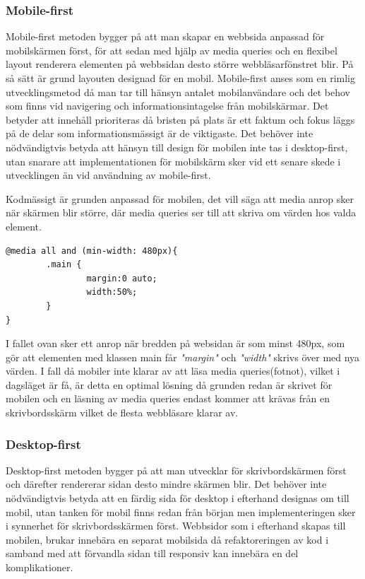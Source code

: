 \documentclass[11pt]{article}
\begin{document}
\subsubsection{Mobile-first}
Mobile-first metoden bygger på att man skapar en webbsida anpassad för mobilskärmen först, för att sedan med hjälp av media queries och en flexibel layout renderera elementen på webbsidan desto större webbläsarfönstret blir.  På så sätt är grund layouten designad för en mobil. Mobile-first anses som en rimlig utvecklingsmetod då man tar till hänsyn antalet mobilanvändare och det behov som finns vid navigering och informationsintagelse från mobilskärmar.  Det betyder att innehåll prioriteras då bristen på plats är ett faktum och fokus läggs på de delar som informationsmässigt är de viktigaste. Det behöver inte nödvändigtvis betyda att hänsyn till design för mobilen inte tas i desktop-first, utan snarare att implementationen för mobilskärm sker vid ett senare skede i utvecklingen än vid användning av mobile-first.

Kodmässigt är grunden anpassad för mobilen, det vill säga att media anrop sker när skärmen blir större, där media queries ser till att skriva om värden hos valda element. 
\vspace{0.5cm}
 \begin{verbatim}
@media all and (min-width: 480px){
        .main {
                margin:0 auto;
                width:50%;
        }
}
\end{verbatim}

\vspace{0.5cm}
I fallet ovan sker ett anrop när bredden på websidan är som minst 480px, som gör att elementen med klassen main får \textit{"margin"} och \textit{"width"} skrivs över med nya värden. I fall då mobiler inte klarar av att läsa media queries(fotnot), vilket i dagsläget är få, är detta en optimal lösning då grunden redan är skrivet för mobilen och en läsning av media queries endast kommer att krävas från en skrivbordsskärm vilket de flesta webbläsare klarar av.

\subsubsection{Desktop-first}
Desktop-first metoden bygger på att man utvecklar för skrivbordskärmen först och därefter rendererar sidan desto mindre skärmen blir. Det behöver inte nödvändigtvis betyda att en färdig sida för desktop i efterhand designas om till mobil, utan tanken för mobil finns redan från början men implementeringen sker i synnerhet för skrivbordsskärmen först. Webbsidor som i efterhand skapas till mobilen, brukar innebära en separat mobilsida då refaktoreringen av kod i samband med att förvandla sidan till responsiv kan innebära en del komplikationer.  
\end{document}
